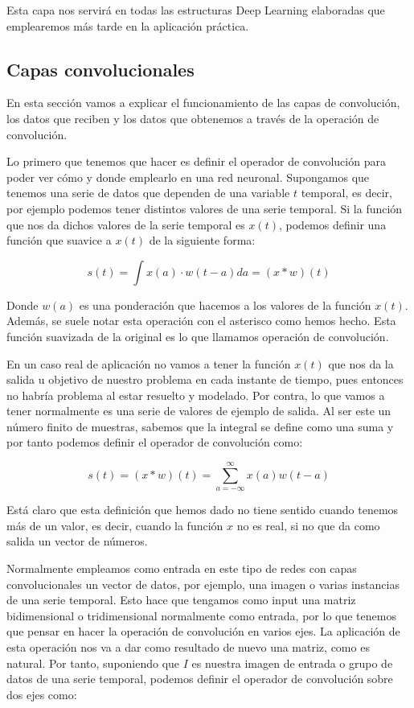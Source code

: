 Esta capa nos servirá en todas las estructuras Deep Learning elaboradas que emplearemos más tarde en la aplicación práctica.

\subsection{Capas convolucionales}

En esta sección vamos a explicar el funcionamiento de las capas de convolución, los datos que reciben y los datos que obtenemos a través de la operación de convolución.

Lo primero que tenemos que hacer es definir el operador de convolución para poder ver cómo y donde emplearlo en una red neuronal. Supongamos que tenemos una serie de datos que dependen de una variable $t$ temporal, es decir, por ejemplo podemos tener distintos valores de una serie temporal. Si la función que nos da dichos valores de la serie temporal es $x(t)$, podemos definir una función que suavice a $x(t)$ de la siguiente forma:

$$s(t) = \int x(a)\cdot w(t-a) da = (x * w)(t)$$

Donde $w(a)$ es una ponderación que hacemos a los valores de la función $x(t)$. Además, se suele notar esta operación con el asterisco como hemos hecho. Esta función suavizada de la original es lo que llamamos operación de convolución.

En un caso real de aplicación no vamos a tener la función $x(t)$ que nos da la salida u objetivo de nuestro problema en cada instante de tiempo, pues entonces no habría problema al estar resuelto y modelado. Por contra, lo que vamos a tener normalmente es una serie de valores de ejemplo de salida. Al ser este un número finito de muestras, sabemos que la integral se define como una suma y por tanto podemos definir el operador de convolución como:

$$s(t) = (x*w)(t) = \sum_{a=-\infty}^{\infty}x(a)w(t-a)$$

Está claro que esta definición que hemos dado no tiene sentido cuando tenemos más de un valor, es decir, cuando la función $x$ no es real, si no que da como salida un vector de números.

Normalmente empleamos como entrada en este tipo de redes con capas convolucionales un vector de datos, por ejemplo, una imagen o varias instancias de una serie temporal. Esto hace que tengamos como input una matriz bidimensional o tridimensional normalmente como entrada, por lo que tenemos que pensar en hacer la operación de convolución en varios ejes. La aplicación de esta operación nos va a dar como resultado de nuevo una matriz, como es natural. Por tanto, suponiendo que $I$ es nuestra imagen de entrada o grupo de datos de una serie temporal, podemos definir el operador de convolución sobre dos ejes como:

